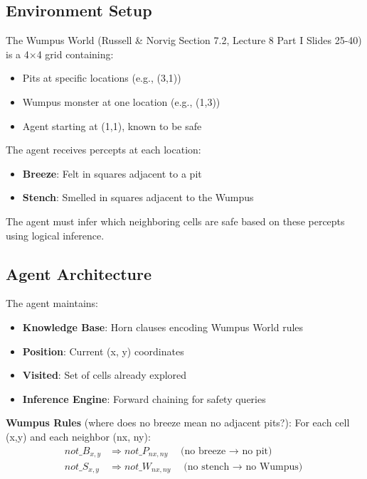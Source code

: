 \documentclass[letterpaper]{article}
\begin{document}
\subsection{Environment Setup}

The Wumpus World (Russell \& Norvig Section 7.2, Lecture 8 Part I Slides 25-40) \cite{russell2020artificial,atyabi2025lecture8} is a 4$\times$4 grid containing:
\begin{itemize}
\item Pits at specific locations (e.g., (3,1))
\item Wumpus monster at one location (e.g., (1,3))
\item Agent starting at (1,1), known to be safe
\end{itemize}

The agent receives percepts at each location:
\begin{itemize}
\item \textbf{Breeze}: Felt in squares adjacent to a pit
\item \textbf{Stench}: Smelled in squares adjacent to the Wumpus
\end{itemize}

The agent must infer which neighboring cells are safe based on these percepts using logical inference.

\subsection{Agent Architecture}

The agent maintains:
\begin{itemize}
\item \textbf{Knowledge Base}: Horn clauses encoding Wumpus World rules
\item \textbf{Position}: Current (x, y) coordinates
\item \textbf{Visited}: Set of cells already explored
\item \textbf{Inference Engine}: Forward chaining for safety queries
\end{itemize}

\textbf{Wumpus Rules} (where does no breeze mean no adjacent pits?): For each cell (x,y) and each neighbor (nx, ny):
\begin{align*}
not\_B_{x,y} &\Rightarrow not\_P_{nx,ny} \quad \text{(no breeze $\rightarrow$ no pit)}\\
not\_S_{x,y} &\Rightarrow not\_W_{nx,ny} \quad \text{(no stench $\rightarrow$ no Wumpus)}
\end{align*}
\end{document}
